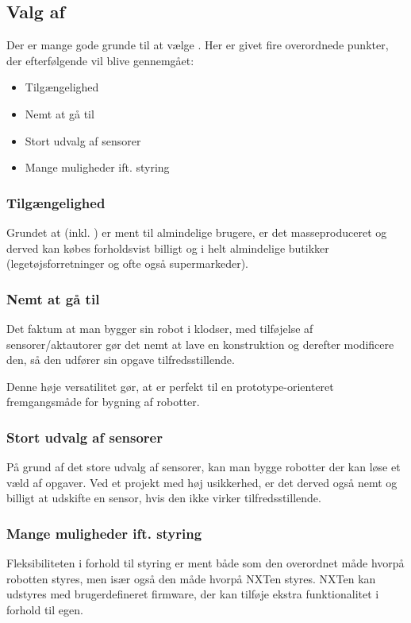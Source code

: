 \subsection{Valg af \legoms}
Der er mange gode grunde til at vælge \legoms.
Her er givet fire overordnede punkter, der efterfølgende vil blive gennemgået:

\begin{itemize}
\item{Tilgængelighed}
\item{Nemt at gå til}
\item{Stort udvalg af sensorer}
\item{Mange muligheder ift. styring}
\end{itemize}

\subsubsection{Tilgængelighed}
Grundet at \lego (inkl. \legoms) er ment til almindelige brugere, er det masseproduceret og derved kan købes forholdsvist billigt og i helt almindelige butikker (legetøjsforretninger og ofte også supermarkeder).

\subsubsection{Nemt at gå til}
Det faktum at man bygger sin robot i \lego klodser, med tilføjelse af \legoms sensorer/aktautorer gør det nemt at lave en konstruktion og derefter modificere den, så den udfører sin opgave tilfredsstillende.

Denne høje versatilitet gør, at \lego er perfekt til en prototype-orienteret fremgangsmåde for bygning af robotter.

\subsubsection{Stort udvalg af sensorer}
På grund af det store udvalg af sensorer, kan man bygge robotter der kan løse et væld af opgaver.
Ved et projekt med høj usikkerhed, er det derved også nemt og billigt at udskifte en sensor, hvis den ikke virker tilfredsstillende.

\subsubsection{Mange muligheder ift. styring}
Fleksibiliteten i forhold til styring er ment både som den overordnet  måde hvorpå robotten styres, men især også den måde hvorpå NXTen styres.
NXTen kan udstyres med brugerdefineret firmware, der kan tilføje ekstra funktionalitet i forhold til \legos egen.

